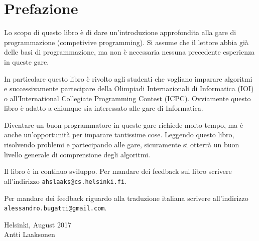 \chapter*{Prefazione}

Lo scopo di questo libro è di dare 
un'introduzione approfondita alla gare di programmazione (competivive programming).
Si assume che il lettore abbia già delle basi di programmazione,
ma non è necessaria nessuna precedente esperienza 
in queste gare.

In particolare questo libro è rivolto agli
studenti che vogliano imparare algoritmi e 
successivamente partecipare della Olimpiadi
Internazionali di Informatica (IOI) o 
all'International Collegiate Programming Contest (ICPC).
Ovviamente questo libro è adatto
a chiunque sia interessato alle gare di Informatica.

Diventare un buon programmatore in queste gare
richiede molto tempo, ma è anche un'opportunità
per imparare tantissime cose.
Leggendo questo libro, risolvendo problemi e 
partecipando alle gare, sicuramente si otterrà
un buon livello generale di comprensione degli algoritmi.

Il libro è in continuo sviluppo.
Per mandare dei feedback sul libro scrivere all'indirizzo
\texttt{ahslaaks@cs.helsinki.fi}.

Per mandare dei feedback riguardo alla traduzione italiana
scrivere all'indirizzo
\texttt{alessandro.bugatti@gmail.com}.


\begin{flushright}
Helsinki, August 2017 \\
Antti Laaksonen
\end{flushright}
